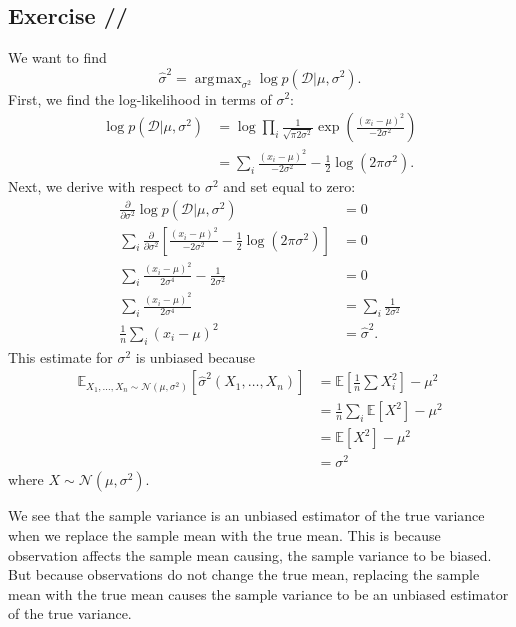 \documentclass[a4paper,11pt]{article}
\DeclareMathOperator*{\argmax}{arg\!\max}
\newcounter{exercise}
\newcounter{subexercise}
\newcommand*{\exercise}[1][]{\subsection*{Exercise \ifx/#1/\stepcounter{exercise}\arabic{exercise}\else#1\fi}\setcounter{subexercise}{0}}
\begin{document}
\exercise
We want to find
\[
    \hat{\sigma}^2 = \argmax_{\sigma^2}\log p(\mathcal{D}|\mu, \sigma^2).
\]
First, we find the log-likelihood in terms of $\sigma^2$:
\begin{align*}
    \log p(\mathcal{D}|\mu, \sigma^2)
    &= \log\prod\limits_i\frac{1}{\sqrt{\pi2\sigma^2}}
    \exp\left(\frac{(x_i-\mu)^2}{-2\sigma^2}\right) \\
    & = \sum\limits_i\frac{(x_i-\mu)^2}{-2\sigma^2} - \frac{1}{2}\log(2\pi\sigma^2).
\end{align*}
Next, we derive with respect to $\sigma^2$ and set equal to zero:
\begin{align*}
    \frac{\partial}{\partial\sigma^2}\log p(\mathcal{D}|\mu, \sigma^2) & = 0 \\
    \sum\limits_i \frac{\partial}{\partial\sigma^2}
    \left[\frac{(x_i-\mu)^2}{-2\sigma^2}
    -\frac{1}{2}\log(2\pi\sigma^2)\right] & = 0 \\
    \sum\limits_i\frac{(x_i-\mu)^2}{2\sigma^4}
    -\frac{1}{2\sigma^2} & = 0 \\
    \sum\limits_i\frac{(x_i-\mu)^2}{2\sigma^4}
    &=\sum\limits_i\frac{1}{2\sigma^2} \\
    \frac{1}{n}\sum\limits_i(x_i-\mu)^2
    &=\hat\sigma^2. 
\end{align*}
This estimate for $\sigma^2$ is unbiased because
\begin{align*}
    \mathbb{E}_{X_1, \dots, X_n \sim \mathcal{N}(\mu, \sigma^2)}
    [\hat\sigma^2(X_1, \dots, X_n)] & = \mathbb{E}\left[\frac{1}{n}\sum X_i^2\right] - \mu^2 \\
    & = \frac{1}{n}\sum\limits_i\mathbb{E}[X^2] - \mu^2 \\
    & = \mathbb{E}[X^2]-\mu^2 \\
    & = \sigma^2
\end{align*}
where $X \sim \mathcal{N}(\mu, \sigma^2)$.

We see that the sample variance is an unbiased estimator of the true variance
when we replace the sample mean with the true mean. This is because observation affects the sample
mean causing, the sample variance to be biased. But because observations do not change the true mean,
replacing the sample mean with the true mean causes the sample variance to be an unbiased estimator
of the true variance.
\end{document}
